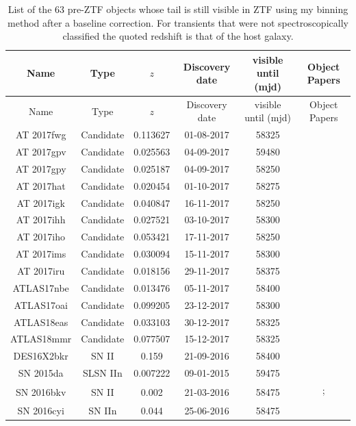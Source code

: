 \documentclass[a4paper,oneside,12pt, class=Latex/Classes/PhDthesisPSnPDF, crop=false]{standalone}
\begin{document}
\tiny
\begin{longtable}{cccccc}
\caption[List of pre-ZTF SNe with tails detectable in ZTF.]{List of the 63 pre-ZTF objects whose tail is still visible in ZTF using my binning method after a baseline correction. For transients that were not spectroscopically classified the quoted redshift is that of the host galaxy.}
 \label{tail_objects}
 \endfirsthead
 \hline
 \hline
 Name &  Type & $z$ & Discovery date & visible until (mjd) & Object Papers \\
 \hline
 \endhead
 \hline
 \endfoot
 \hline
 \endlastfoot
 \hline
 \hline
 Name &  Type & $z$ & Discovery date & visible until (mjd) & Object Papers \\
 \hline
 AT 2017fwg & Candidate & 0.113627 & 01-08-2017 & 58325 & \\
 AT 2017gpv & Candidate & 0.025563 & 04-09-2017 & 59480 & \\
 AT 2017gpy & Candidate & 0.025187 & 04-09-2017 & 58250 & \\
 AT 2017hat & Candidate & 0.020454 & 01-10-2017 & 58275 & \\
 AT 2017igk & Candidate & 0.040847 & 16-11-2017 & 58250 & \\
 AT 2017ihh & Candidate & 0.027521 & 03-10-2017 & 58300 & \\
 AT 2017iho & Candidate & 0.053421 & 17-11-2017 & 58250 & \\
 AT 2017ims & Candidate & 0.030094 & 15-11-2017 & 58300 & \\
 AT 2017iru & Candidate & 0.018156 & 29-11-2017 & 58375 & \\
 ATLAS17nbe & Candidate & 0.013476 & 05-11-2017 & 58400 & \\
 ATLAS17oai & Candidate & 0.099205 & 23-12-2017 & 58300 & \\
 ATLAS18eas & Candidate & 0.033103 & 30-12-2017 & 58325 & \\
 ATLAS18mmr & Candidate & 0.077507 & 15-12-2017 & 58325 & \\
 DES16X2bkr & SN II & 0.159 & 21-09-2016 & 58400 & \\
 SN 2015da & SLSN IIn & 0.007222 & 09-01-2015 & 59475 & \citet{2015da_2020, 2015da_2024}\\
 \multirow{2}{*}{SN 2016bkv} & \multirow{2}{*}{SN II} & \multirow{2}{*}{0.002} & \multirow{2}{*}{21-03-2016} & \multirow{2}{*}{58475} & \citet{2016bkv_Hosseinzadeh};\\
 &&&&&\citet{2016bkv_Nakaoka, 2016bkv_Deckers}\\
 SN 2016cyi & SN IIn & 0.044 & 25-06-2016 & 58475 & \\

\end{longtable}
\end{document}
